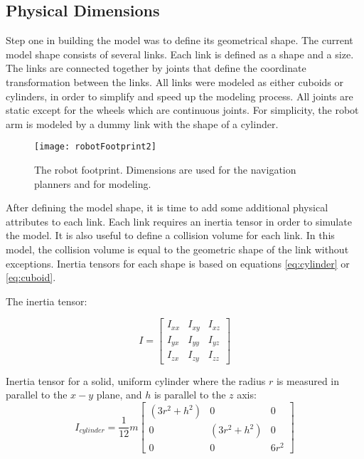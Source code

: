 \subsection{Physical Dimensions}

Step one in building the model was to define its geometrical shape. The current model shape consists of several links. Each link is defined as a shape and a size. The links are connected together by joints that define the coordinate transformation between the links. All links were modeled as either cuboids or cylinders, in order to simplify and speed up the modeling process. All joints are static except for the wheels which are continuous joints. For simplicity, the robot arm is modeled by a dummy link with the shape of a cylinder.

\begin{figure}[h]
	\centering
	\texttt{[image: robotFootprint2]}
	\caption{The robot footprint. Dimensions are used for the navigation planners and for modeling. }
	\label{fig:robotFootprint}
\end{figure}

After defining the model shape, it is time to add some additional physical attributes to each link. Each link requires an inertia tensor in order to simulate the model. It is also useful to define a collision volume for each link. In this model, the collision volume is equal to the geometric shape of the link without exceptions. Inertia tensors for each shape is based on equations \ref{eq:cylinder} or \ref{eq:cuboid}.

The inertia tensor:

\begin{equation}
    	I = \begin{bmatrix}
    	I_{xx} & I_{xy} & I_{xz} \\[0.3em]
    	I_{yx} & I_{yy} & I_{yz} \\[0.3em]
    	I_{zx} & I_{zy} & I_{zz}
    	\end{bmatrix}
\end{equation}

Inertia tensor for a solid, uniform cylinder where the radius $r$ is measured in parallel to the $x - y$ plane, and $h$ is parallel to the $z$ axis:
\begin{equation}
I_{cylinder} = \frac{1}{12}m \begin{bmatrix}
	(3 r^2 + h^2) & 0 & 0 \\[0.3em]
	0 & (3 r^2 + h^2) & 0 \\[0.3em]
	0 & 0 & 6r^2
	\end{bmatrix}
	\label{eq:cylinder}
\end{equation}

